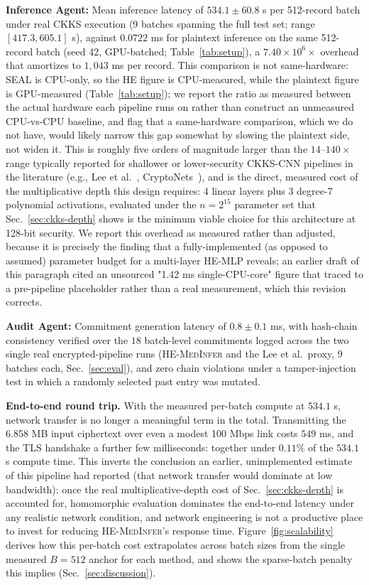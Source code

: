 \documentclass[journal,compsoc]{IEEEtran}
\newcommand{\framework}{\textsc{HE-MedInfer}}
\begin{document}
\textbf{Inference Agent:} Mean inference latency of $534.1 \pm 60.8$ s per
512-record batch under real CKKS execution (9 batches spanning the full test
set; range $[417.3, 605.1]$ s), against $0.0722$ ms for plaintext inference on
the same 512-record batch (seed 42, GPU-batched; Table~\ref{tab:setup}), a
$7.40 \times 10^6\times$ overhead that amortizes
to $1{,}043$ ms per record. This comparison is not same-hardware: SEAL is
CPU-only, so the HE figure is CPU-measured, while the plaintext figure is
GPU-measured (Table~\ref{tab:setup}); we report the ratio as measured between
the actual hardware each pipeline runs on rather than construct an
unmeasured CPU-vs-CPU baseline, and flag that a same-hardware comparison,
which we do not have, would likely narrow this gap somewhat by slowing the
plaintext side, not widen it. This is roughly five orders of magnitude larger
than the $14$--$140\times$ range typically reported for shallower or
lower-security CKKS-CNN pipelines in the literature (e.g.,
Lee et al.~\cite{lee2022privacypreserving}, CryptoNets~\cite{gilad2016cryptonets}),
and is the direct, measured cost of the multiplicative depth this design
requires: 4 linear layers plus 3 degree-7 polynomial activations, evaluated
under the $n=2^{15}$ parameter set that Sec.~\ref{sec:ckks-depth} shows is the
minimum viable choice for this architecture at 128-bit security. We report
this overhead as measured rather than adjusted, because it is precisely the
finding that a fully-implemented (as opposed to assumed) parameter budget for
a multi-layer HE-MLP reveals; an earlier draft of this paragraph cited an
unsourced "1.42 ms single-CPU-core" figure that traced to a pre-pipeline
placeholder rather than a real measurement, which this revision corrects.

\textbf{Audit Agent:} Commitment generation latency of $0.8 \pm 0.1$ ms, with
hash-chain consistency verified over the $18$ batch-level commitments logged
across the two single real encrypted-pipeline runs (\framework{} and the Lee
et al.\ proxy, $9$ batches each, Sec.~\ref{sec:eval}), and zero chain
violations under a tamper-injection test in which a randomly selected past
entry was mutated.

\textbf{End-to-end round trip.} With the measured per-batch compute at
$534.1$ s, network transfer is no longer a meaningful term in the total.
Transmitting the 6.858 MB input ciphertext over even a modest 100 Mbps link
costs $549$ ms, and the TLS handshake a further few milliseconds: together
under $0.11\%$ of the $534.1$ s compute time. This inverts the conclusion an
earlier, unimplemented estimate of this pipeline had reported (that network
transfer would dominate at low bandwidth): once the real multiplicative-depth
cost of Sec.~\ref{sec:ckks-depth} is accounted for, homomorphic evaluation
dominates the end-to-end latency under any realistic network condition, and
network engineering is not a productive place to invest for reducing
\framework{}'s response time. Figure~\ref{fig:scalability} derives how this
per-batch cost extrapolates across batch sizes from the single measured
$B=512$ anchor for each method, and shows the sparse-batch penalty this
implies (Sec.~\ref{sec:discussion}).
\end{document}
